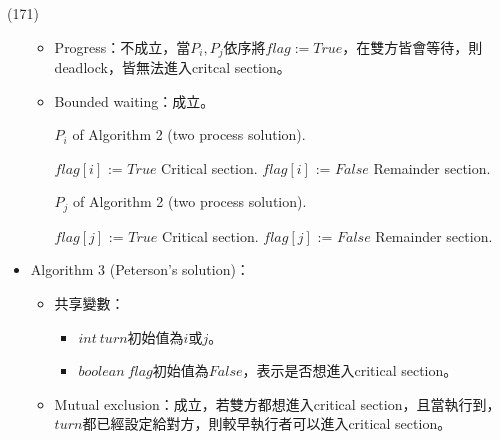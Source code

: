 \begin{theorem}{(171)}
\begin{itemize}
\begin{itemize}
            \item Progress：不成立，當$P_i, P_j$依序將$flag := True$，在雙方皆會等待，則deadlock，皆無法進入critcal section。
            \item Bounded waiting：成立。 
            \begin{algorithm}[H]
                \caption{$P_i$ of Algorithm 2 (two process solution).}
                \begin{algorithmic}[1]
                        \Repeat 
                            \State $flag[i]$ := $True$
                            \EndWhile
                            \State Critical section.
                            \State $flag[i]$ := $False$
                            \State Remainder section.
                    \EndFunction
                \end{algorithmic}
            \end{algorithm} 
            \begin{algorithm}[H]
                \caption{$P_j$ of Algorithm 2 (two process solution).}
                \begin{algorithmic}[1]
                        \Repeat 
                            \State $flag[j]$ := $True$
                            \EndWhile
                            \State Critical section.
                            \State $flag[j]$ := $False$
                            \State Remainder section.
                    \EndFunction
                \end{algorithmic}
            \end{algorithm} 
        \end{itemize}
        \item Algorithm 3 (Peterson's solution)：\begin{itemize}
            \item 共享變數：\begin{itemize}
                \item $int \ turn$初始值為$i$或$j$。
                \item $boolean \ flag$初始值為$False$，表示是否想進入critical section。
            \end{itemize}
            \item Mutual exclusion：成立，若雙方都想進入critical section，且當執行到，$turn$都已經設定給對方，則較早執行者可以進入critical section。

\end{itemize}
\end{itemize}
\end{theorem}
